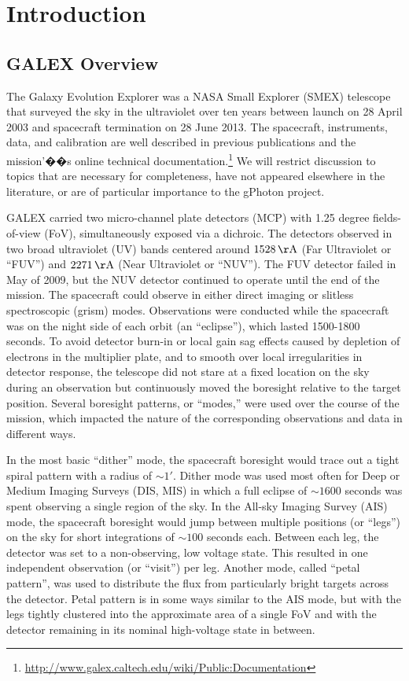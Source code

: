 \documentclass[preprint]{aastex}
\begin{document}
\section{Introduction}
\subsection{GALEX Overview}
The Galaxy Evolution Explorer \citep{mar2005} was a NASA Small Explorer (SMEX) telescope that surveyed the sky in the ultraviolet over ten years between launch on 28 April 2003 and spacecraft termination on 28 June 2013. The spacecraft, instruments, data, and calibration are well described in previous publications \citep{mor2005,mor2007} and the mission'��s online technical documentation.\footnote{\url{http://www.galex.caltech.edu/wiki/Public:Documentation}} We will restrict discussion to topics that are necessary for completeness, have not appeared elsewhere in the literature, or are of particular importance to the gPhoton project.

GALEX carried two micro-channel plate detectors (MCP) with 1.25 degree fields-of-view (FoV), simultaneously exposed via a dichroic. The detectors observed in two broad ultraviolet (UV) bands centered around $1528\,\rm{\AA}$ (Far Ultraviolet or ``FUV'') and $2271\,\rm{\AA}$ (Near Ultraviolet or ``NUV''). The FUV detector failed in May of 2009, but the NUV detector continued to operate until the end of the mission. The spacecraft could observe in either direct imaging or slitless spectroscopic (grism) modes. Observations were conducted while the spacecraft was on the night side of each orbit (an ``eclipse''), which lasted 1500-1800 seconds. To avoid detector burn-in or local gain sag effects caused by depletion of electrons in the multiplier plate, and to smooth over local irregularities in detector response, the telescope did not stare at a fixed location on the sky during an observation but continuously moved the boresight relative to the target position. Several boresight patterns, or ``modes,'' were used over the course of the mission, which impacted the nature of the corresponding observations and data in different ways.

In the most basic ``dither'' mode, the spacecraft boresight would trace out a tight spiral pattern with a radius of $\sim1'$. Dither mode was used most often for Deep or Medium Imaging Surveys (DIS, MIS) in which a full eclipse of $\sim1600$ seconds was spent observing a single region of the sky. In the All-sky Imaging Survey (AIS) mode, the spacecraft boresight would jump between multiple positions (or ``legs'') on the sky for short integrations of $\sim100$ seconds each. Between each leg, the detector was set to a non-observing, low voltage state. This resulted in one independent observation (or ``visit'') per leg. Another mode, called ``petal pattern'', was used to distribute the flux from particularly bright targets across the detector. Petal pattern is in some ways similar to the AIS mode, but with the legs tightly clustered into the approximate area of a single FoV and with the detector remaining in its nominal high-voltage state in between.
\end{document}
